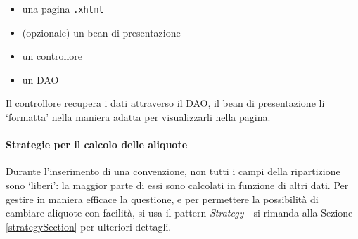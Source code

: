 \begin{itemize}
\item una pagina \texttt{.xhtml}
\item (opzionale) un bean di presentazione
\item un controllore
\item un DAO\newline

\end{itemize}
Il controllore recupera i dati attraverso il DAO, il bean di presentazione li \textquoteleft formatta' nella maniera adatta per visualizzarli nella pagina.

\paragraph{Strategie per il calcolo delle aliquote}
Durante l'inserimento di una convenzione, non tutti i campi della ripartizione sono \textquoteleft liberi': la maggior parte di essi sono calcolati in funzione di altri dati. Per gestire in maniera efficace la questione, e per permettere la possibilità di cambiare aliquote con facilità, si usa il pattern \textsl{Strategy} - si rimanda alla Sezione \ref{strategySection} per ulteriori dettagli. 
